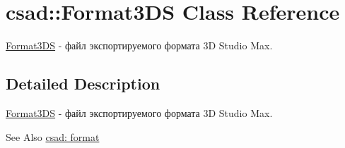 \hypertarget{classcsad_1_1_format3_d_s}{\section{csad\-:\-:Format3\-D\-S Class Reference}
\label{classcsad_1_1_format3_d_s}
}


\hyperlink{classcsad_1_1_format3_d_s}{Format3\-D\-S} -\/ файл экспортируемого формата 3\-D Studio Max.  




\subsection{Detailed Description}
\hyperlink{classcsad_1_1_format3_d_s}{Format3\-D\-S} -\/ файл экспортируемого формата 3\-D Studio Max. 

\begin{DoxySeeAlso}{See Also}
\hyperlink{group__format}{csad\-: format} 
\end{DoxySeeAlso}
